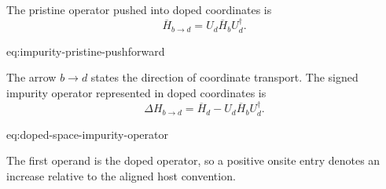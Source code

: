 The pristine operator pushed into doped coordinates is
\begin{equation}
    \overline H_{b\to d}
    =
    U_d\overline H_bU_d^{\dagger}.
    \label{eq:impurity-pristine-pushforward}
\end{equation}
\begin{equationterms}{eq:impurity-pristine-pushforward}
\end{equationterms}
The arrow $b\to d$ states the direction of coordinate transport. The signed
impurity operator represented in doped coordinates is
\begin{equation}
    \boxed{
    \Delta H_{b\to d}
    =
    \overline H_d
    -
    U_d\overline H_bU_d^{\dagger}}
    .
    \label{eq:doped-space-impurity-operator}
\end{equation}
\begin{equationterms}{eq:doped-space-impurity-operator}
\end{equationterms}
The first operand is the doped operator, so a positive onsite entry denotes an
increase relative to the aligned host convention.

